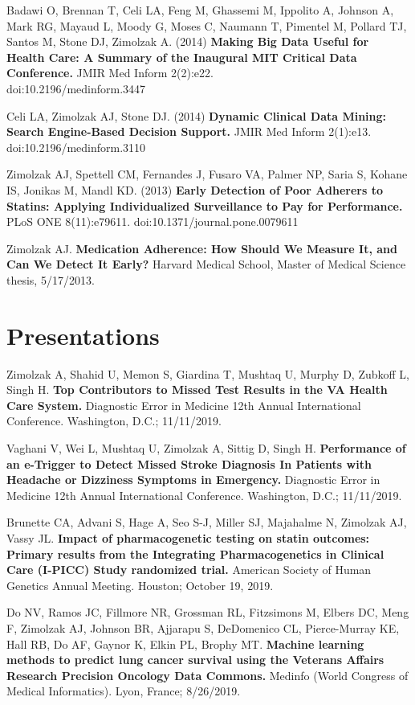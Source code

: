 \documentclass[10pt]{article}
\begin{document}
Badawi O, Brennan T, Celi LA, Feng M, Ghassemi M, Ippolito A, Johnson
A, Mark RG, Mayaud L, Moody G, Moses C, Naumann T, Pimentel M, Pollard
TJ, Santos M, Stone DJ, Zimolzak A. (2014) \textbf{Making Big Data
  Useful for Health Care: A Summary of the Inaugural MIT Critical Data
  Conference.} JMIR Med Inform 2(2):e22.\\
doi:10.2196/medinform.3447

Celi LA, Zimolzak AJ, Stone DJ. (2014) \textbf{Dynamic Clinical Data
  Mining: Search Engine-Based Decision Support.} JMIR Med Inform
2(1):e13. doi:10.2196/medinform.3110

Zimolzak AJ, Spettell CM, Fernandes J, Fusaro VA, Palmer NP, Saria S,
Kohane IS, Jonikas M, Mandl KD. (2013) \textbf{Early Detection of Poor
  Adherers to Statins: Applying Individualized Surveillance to Pay for
  Performance.} PLoS ONE 8(11):e79611.
doi:10.1371/journal.pone.0079611

Zimolzak AJ. \textbf{Medication Adherence: How Should We Measure It,
  and Can We Detect It Early?} Harvard Medical School, Master of
Medical Science thesis, 5/17/2013.

\section*{Presentations} %

Zimolzak A, Shahid U, Memon S, Giardina T, Mushtaq U, Murphy D,
Zubkoff L, Singh H. \textbf{Top Contributors to Missed Test Results in
  the VA Health Care System.} Diagnostic Error in Medicine 12th Annual
International Conference. Washington, D.C.; 11/11/2019.

Vaghani V, Wei L, Mushtaq U, Zimolzak A, Sittig D, Singh H.
\textbf{Performance of an e-Trigger to Detect Missed Stroke Diagnosis
  In Patients with Headache or Dizziness Symptoms in Emergency.}
Diagnostic Error in Medicine 12th Annual International Conference.
Washington, D.C.; 11/11/2019.

Brunette CA, Advani S, Hage A, Seo S-J, Miller SJ, Majahalme N,
Zimolzak AJ, Vassy JL. \textbf{Impact of pharmacogenetic testing on
  statin outcomes: Primary results from the Integrating
  Pharmacogenetics in Clinical Care (I-PICC) Study randomized trial.}
American Society of Human Genetics Annual Meeting. Houston; October
19, 2019.

Do NV, Ramos JC, Fillmore NR, Grossman RL, Fitzsimons M, Elbers DC,
Meng F, Zimolzak AJ, Johnson BR, Ajjarapu S, DeDomenico CL,
Pierce-Murray KE, Hall RB, Do AF, Gaynor K, Elkin PL, Brophy MT.
\textbf{Machine learning methods to predict lung cancer survival using
  the Veterans Affairs Research Precision Oncology Data Commons.}
Medinfo (World Congress of Medical Informatics). Lyon, France;
8/26/2019.
\end{document}
